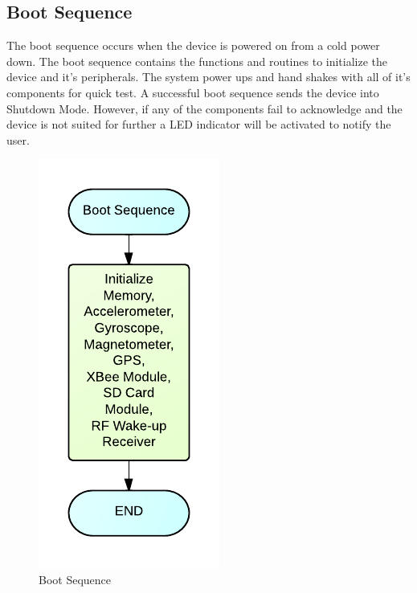 \subsection{Boot Sequence}
The boot sequence occurs when the device is powered on from a cold power down. The boot sequence contains the functions and routines to initialize the device and it's peripherals. The system power ups and hand shakes with all of it's components for quick test. A successful boot sequence sends the device into Shutdown Mode. However, if any of the components fail to acknowledge and the device is not suited for further a LED indicator will be activated to notify the user.
\begin{figure}[H]
	\centering
	\includegraphics[scale=1.0]{img/BootSequenceFlowchart}
	\caption{Boot Sequence \label{fig:bootSequence}}
\end{figure}

